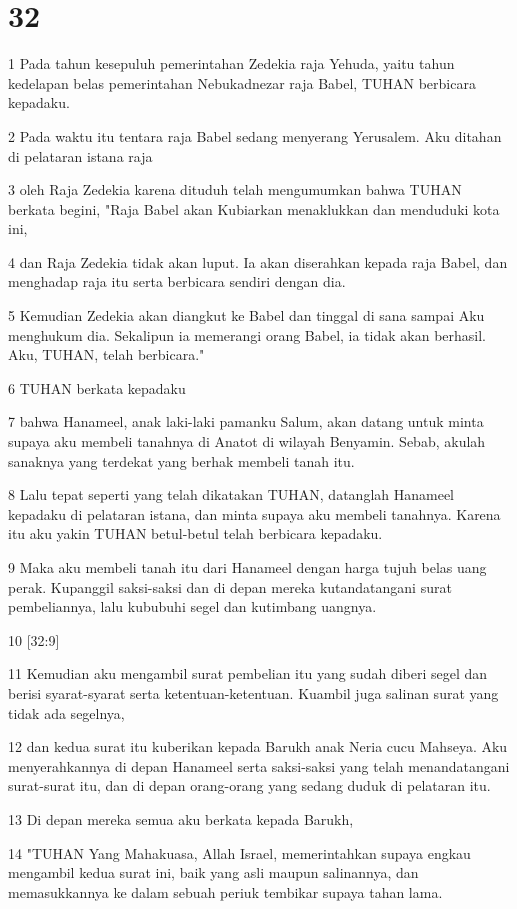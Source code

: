 \chapter{32}

\par 1 Pada tahun kesepuluh pemerintahan Zedekia raja Yehuda, yaitu tahun kedelapan belas pemerintahan Nebukadnezar raja Babel, TUHAN berbicara kepadaku.
\par 2 Pada waktu itu tentara raja Babel sedang menyerang Yerusalem. Aku ditahan di pelataran istana raja
\par 3 oleh Raja Zedekia karena dituduh telah mengumumkan bahwa TUHAN berkata begini, "Raja Babel akan Kubiarkan menaklukkan dan menduduki kota ini,
\par 4 dan Raja Zedekia tidak akan luput. Ia akan diserahkan kepada raja Babel, dan menghadap raja itu serta berbicara sendiri dengan dia.
\par 5 Kemudian Zedekia akan diangkut ke Babel dan tinggal di sana sampai Aku menghukum dia. Sekalipun ia memerangi orang Babel, ia tidak akan berhasil. Aku, TUHAN, telah berbicara."
\par 6 TUHAN berkata kepadaku
\par 7 bahwa Hanameel, anak laki-laki pamanku Salum, akan datang untuk minta supaya aku membeli tanahnya di Anatot di wilayah Benyamin. Sebab, akulah sanaknya yang terdekat yang berhak membeli tanah itu.
\par 8 Lalu tepat seperti yang telah dikatakan TUHAN, datanglah Hanameel kepadaku di pelataran istana, dan minta supaya aku membeli tanahnya. Karena itu aku yakin TUHAN betul-betul telah berbicara kepadaku.
\par 9 Maka aku membeli tanah itu dari Hanameel dengan harga tujuh belas uang perak. Kupanggil saksi-saksi dan di depan mereka kutandatangani surat pembeliannya, lalu kububuhi segel dan kutimbang uangnya.
\par 10 [32:9]
\par 11 Kemudian aku mengambil surat pembelian itu yang sudah diberi segel dan berisi syarat-syarat serta ketentuan-ketentuan. Kuambil juga salinan surat yang tidak ada segelnya,
\par 12 dan kedua surat itu kuberikan kepada Barukh anak Neria cucu Mahseya. Aku menyerahkannya di depan Hanameel serta saksi-saksi yang telah menandatangani surat-surat itu, dan di depan orang-orang yang sedang duduk di pelataran itu.
\par 13 Di depan mereka semua aku berkata kepada Barukh,
\par 14 "TUHAN Yang Mahakuasa, Allah Israel, memerintahkan supaya engkau mengambil kedua surat ini, baik yang asli maupun salinannya, dan memasukkannya ke dalam sebuah periuk tembikar supaya tahan lama.
